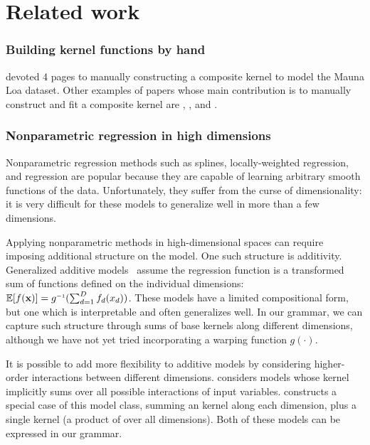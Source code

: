




\section{Related work}
\label{sec:gpss-related-work}

\def\rwsheader{\subsubsection}

\rwsheader{Building kernel functions by hand}
\citet[chapter 5]{rasmussen38gaussian} devoted 4 pages to manually constructing a composite kernel to model the Mauna Loa dataset.
Other examples of papers whose main contribution is to manually construct and fit a composite \gp{} kernel are \citet{textperiodic13}, \citet{lloydgefcom2012}, and \citet{EdgarTelescope}.


\rwsheader{Nonparametric regression in high dimensions}
Nonparametric regression methods such as splines, locally-weighted regression, and \gp{} regression are popular because they are capable of learning arbitrary smooth functions of the data.
Unfortunately, they suffer from the curse of dimensionality: it is very difficult for these models to generalize well in more than a few dimensions.

Applying nonparametric methods in high-dimensional spaces can require imposing additional structure on the model.
One such structure is additivity.
Generalized additive models~\citep{hastie1990generalized} assume the regression function is a transformed sum of functions defined on the individual dimensions: $\expect[f(\vx)] = g\inv(\sum_{d=1}^D f_d(x_d))$.
These models have a limited compositional form, but one which is interpretable and often generalizes well.
In our grammar, we can capture such structure through sums of base kernels along different dimensions, although we have not yet tried incorporating a warping function $g(\cdot)$.

It is possible to add more flexibility to additive models by considering higher-order interactions between different dimensions. 
 considers \gp{} models whose kernel implicitly sums over all possible interactions of input variables.
\citet{plate1999accuracy} constructs a special case of this model class, summing an \kSE{} kernel along each dimension, plus a single \seard{} kernel (a product of \kSE{} over all dimensions).
Both of these models can be expressed in our grammar.

